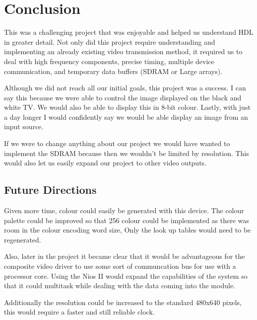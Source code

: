 \section{Conclusion}
This was a challenging project that was enjoyable and helped us understand HDL
in greater detail. Not only did this project require understanding and 
implementing an already existing video transmission method, it required us 
to deal with high frequency components, precise timing, multiple device 
communication, and temporary data buffers (SDRAM or Large arrays).

Although we did not reach all our initial goals, this project was a success. 
I can say this because we were able to control the image displayed on the black
and white TV. We would also be able to display this in 8-bit colour. Lastly, 
with just a day longer I would confidently say we would be able display an 
image from an input source.

If we were to change anything about our project we would have wanted to implement
the SDRAM because then we wouldn't be limited by resolution. This would also
let us easily expand our project to other video outputs.

\newpage

\subsection{Future Directions}

Given more time, colour could easily be generated with this device. The colour
palette could be improved so that 256 colour could be implemented as there was
room in the colour encoding word size, Only the look up tables would need to be
regenerated. 

Also, later in the project it became clear that it would be advantageous for the
composite video driver to use some sort of communcation bus for use with a
processor core. Using the Nios II would expand the capabilities of the system so
that it could multitask while dealing with the data coming into the module.

Additionally the resolution could be increased to the standard 480x640 pixels,
this would require a faster and still reliable clock.
